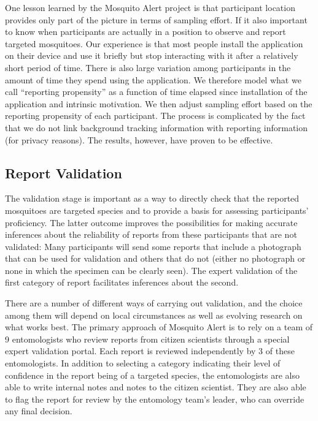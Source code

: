 \documentclass[]{article}
\begin{document}
One lesson learned by the Mosquito Alert project is that participant location provides only part of the picture in terms of sampling effort. If it also important to know when participants are actually in a position to observe and report targeted mosquitoes. Our experience is that most people install the application on their device and use it briefly but stop interacting with it after a relatively short period of time. There is also large variation among participants in the amount of time they spend using the application. We therefore model what we call ``reporting propensity'' as a function of time elapsed since installation of the application and intrinsic motivation. We then adjust sampling effort based on the reporting propensity of each participant. The process is complicated by the fact that we do not link background tracking information with reporting information (for privacy reasons). The results, however, have proven to be effective.

\hypertarget{report-validation}{%
\subsection{Report Validation}\label{report-validation}}

The validation stage is important as a way to directly check that the reported mosquitoes are targeted species and to provide a basis for assessing participants' proficiency. The latter outcome improves the possibilities for making accurate inferences about the reliability of reports from these participants that are not validated: Many participants will send some reports that include a photograph that can be used for validation and others that do not (either no photograph or none in which the specimen can be clearly seen). The expert validation of the first category of report facilitates inferences about the second.

There are a number of different ways of carrying out validation, and the choice among them will depend on local circumstances as well as evolving research on what works best. The primary approach of Mosquito Alert is to rely on a team of 9 entomologists who review reports from citizen scientists through a special expert validation portal. Each report is reviewed independently by 3 of these entomologists. In addition to selecting a category indicating their level of confidence in the report being of a targeted species, the entomologists are also able to write internal notes and notes to the citizen scientist. They are also able to flag the report for review by the entomology team's leader, who can override any final decision.
\end{document}

